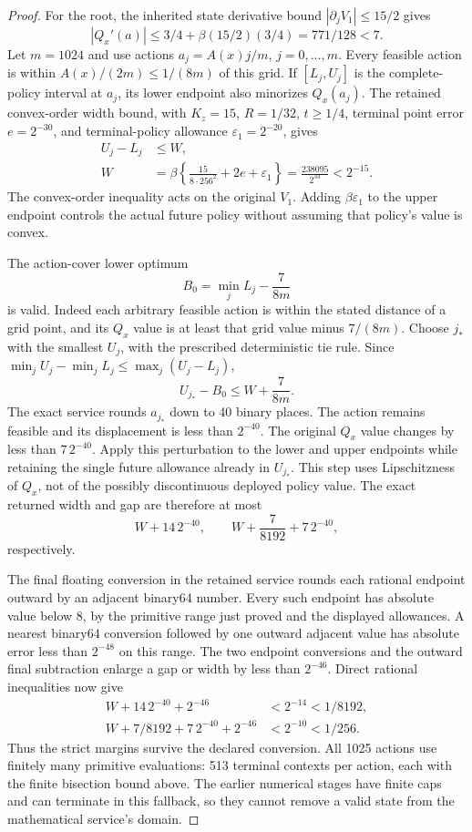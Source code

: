 \begin{proof}
For the root, the inherited state derivative
bound \(|\partial_jV_1|\leq15/2\) gives
\[
 |Q_x'(a)|
 \leq3/4+\beta(15/2)(3/4)
                         =771/128<7.
\]
Let \(m=1024\) and use actions
\(a_j=A(x)j/m\), \(j=0,\ldots,m\).
Every feasible action is within
\(A(x)/(2m)\leq1/(8m)\) of this grid.
If \([L_j,U_j]\) is the complete-policy
interval at \(a_j\), its lower endpoint
also minorizes \(Q_x(a_j)\).
The retained convex-order width bound,
with \(K_z=15\), \(R=1/32\), \(t\geq1/4\),
terminal point error \(e=2^{-30}\), and
terminal-policy allowance \(\varepsilon_1=2^{-20}\),
gives
\begin{align}
 U_j-L_j&\leq W,\nonumber\\
 W&=\beta\left\{\frac{15}{8\cdot256^2}
                      +2e+\varepsilon_1\right\}
   =\frac{238095}{2^{33}}<2^{-15}.
 \label{eq:fallbackwidth121}
\end{align}
The convex-order inequality acts on the
original \(V_1\).  Adding
\(\beta\varepsilon_1\) to the upper endpoint
controls the actual future policy without
assuming that policy's value is convex.

The action-cover lower optimum
\[
 B_0=\min_j L_j-\frac7{8m}
\]
is valid.  Indeed each arbitrary feasible
action is within the stated distance of a
grid point, and its \(Q_x\) value is at
least that grid value minus \(7/(8m)\).
Choose \(j_*\) with the smallest \(U_j\),
with the prescribed deterministic tie rule.
Since
\(\min_jU_j-\min_jL_j\leq\max_j(U_j-L_j)\),
\[
 U_{j_*}-B_0\leq W+\frac7{8m}.
\]
The exact service rounds \(a_{j_*}\)
down to 40 binary places.  The action
remains feasible and its displacement is
less than \(2^{-40}\).
The original \(Q_x\) value changes by
less than \(7\,2^{-40}\).
Apply this perturbation to the lower
and upper endpoints while retaining
the single future allowance already
in \(U_{j_*}\).
This step uses Lipschitzness of \(Q_x\),
not of the possibly discontinuous
deployed policy value.
The exact returned width and gap are
therefore at most
\[
 W+14\,2^{-40},\qquad
 W+\frac7{8192}+7\,2^{-40},
\]
respectively.

The final floating conversion in the
retained service rounds each rational
endpoint outward by an adjacent binary64
number.  Every such endpoint has
absolute value below 8, by the
primitive range just proved and the
displayed allowances.
A nearest binary64 conversion followed
by one outward adjacent value has
absolute error less than \(2^{-48}\)
on this range.
The two endpoint conversions and the
outward final subtraction enlarge a
gap or width by less than \(2^{-46}\).
Direct rational inequalities now give
\begin{align*}
 W+14\,2^{-40}+2^{-46}&<2^{-14}<1/8192,\\
 W+7/8192+7\,2^{-40}+2^{-46}&<2^{-10}<1/256.
\end{align*}
Thus the strict margins survive the
declared conversion.
All 1025 actions use finitely many
primitive evaluations: 513 terminal
contexts per action, each with the
finite bisection bound above.
The earlier numerical stages have
finite caps and can terminate in this
fallback, so they cannot remove a
valid state from the mathematical
service's domain.


\end{proof}
